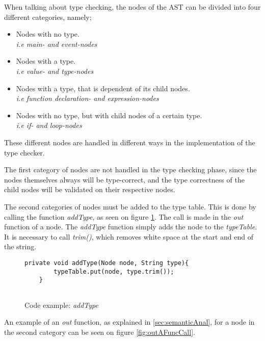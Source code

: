 When talking about type checking, the nodes of the AST can be divided into four different categories, namely;

\begin{itemize}
    \item Nodes with no type.\\
    \textit{i.e main- and event-nodes}
    
    \item Nodes with a type. \\
    \textit{i.e value- and type-nodes}
    
    \item Nodes with a type, that is dependent of its child nodes.\\
    \textit{i.e function declaration- and expression-nodes}
    
    \item Nodes with no type, but with child nodes of a certain type.\\
    \textit{i.e if- and loop-nodes}
\end{itemize}

These different nodes are handled in different ways in the implementation of the type checker.

The first category of nodes are not handled in the type checking phase, since the nodes themselves always will be type-correct, and the type correctness of the child nodes will be validated on their respective nodes.

The second categories of nodes must be added to the type table. This is done by calling the function \textit{addType}, as seen on figure \ref{fig:addtype}. The call is made in the \textit{out} function of a node. The \textit{addType} function simply adds the node to the \textit{typeTable}. It is necessary to call \textit{trim()}, which removes white space at the start and end of the string.


\begin{figure}[H]
\centering
\begin{lstlisting}[]
    private void addType(Node node, String type){
        typeTable.put(node, type.trim());
    }
    
\end{lstlisting}
\caption{Code example: \textit{addType}}
\label{fig:addtype}
\end{figure}

An example of an \textit{out} function, as explained in \ref{sec:semanticAnal}, for a node in the second category can be seen on figure \ref{fig:outAFuncCall}.

